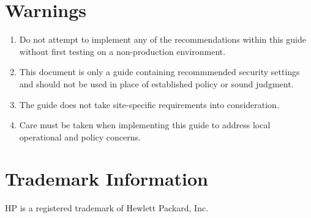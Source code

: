 \section{Warnings}
\begin{enumerate}
\item Do not attempt to implement any of the recommendations within this guide without first testing on a non-production environment.
\item This document is only a guide containing recommmended security settings and should not be used in place of established policy or sound judgment.
\item The guide does not take site-specific requirements into consideration. 
\item Care must be taken when implementing this guide to address local operational and policy concerns.
\end{enumerate}
\section{Trademark Information}
HP is a registered trademark of Hewlett Packard, Inc.
